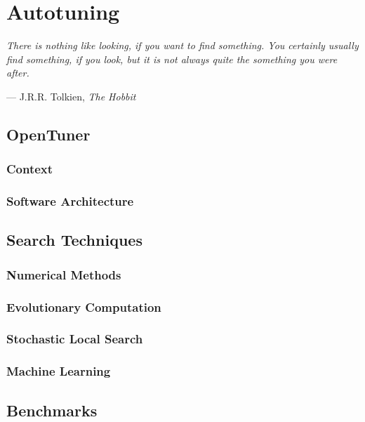 \chapter{Autotuning}
\label{chap:autotuning}
\epigraph{\textit{There is nothing like looking, if you want to find something. You
certainly usually find something, if you look, but it is not always quite the
something you were after.}}{--- J.R.R. Tolkien, \textit{The Hobbit}}

\section{OpenTuner}
\label{sec:opentuner}

\subsection{Context}
\label{subsec:context}

\subsection{Software Architecture}
\label{subsec:arch}

\section{Search Techniques}
\label{sec:techniques}

\subsection{Numerical Methods}
\label{subsec:num}

\subsection{Evolutionary Computation}
\label{subsec:tuninevolcomp}

\subsection{Stochastic Local Search}
\label{subsec:tuningsls}

\subsection{Machine Learning}
\label{subsec:tuningml}

\section{Benchmarks}
\label{sec:benchmarks}

